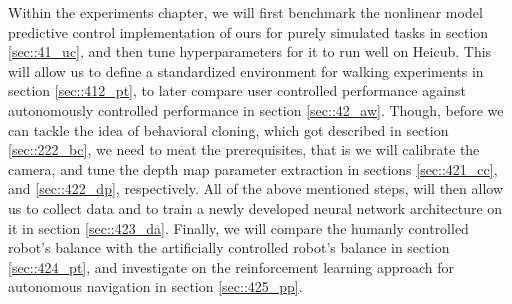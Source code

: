 \label{sec::4_ex}
Within the experiments chapter, we will first benchmark the nonlinear model predictive control implementation of ours for purely simulated tasks in section \ref{sec::41_uc}, and then tune hyperparameters for it to run well on Heicub. This will allow us to define a standardized environment for walking experiments in section \ref{sec::412_pt}, to later compare user controlled performance against autonomously controlled performance in section \ref{sec::42_aw}. Though, before we can tackle the idea of behavioral cloning, which got described in section \ref{sec::222_bc}, we need to meat the prerequisites, that is we will calibrate the camera, and tune the depth map parameter extraction in sections \ref{sec::421_cc}, and \ref{sec::422_dp}, respectively. All of the above mentioned steps, will then allow us to collect data and to train a newly developed neural network architecture on it in section \ref{sec::423_da}. Finally, we will compare the humanly controlled robot's balance with the artificially controlled robot's balance in section \ref{sec::424_pt}, and investigate on the reinforcement learning approach for autonomous navigation in section \ref{sec::425_pp}.